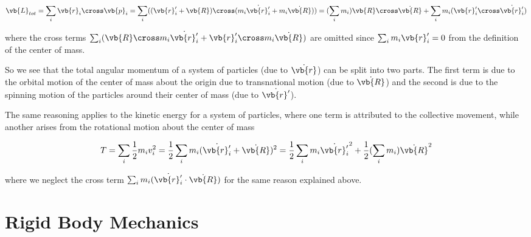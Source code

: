 \documentclass[a4paper,12pt]{report}
\begin{document}
\begin{equation}
	\vb{L} _{tot} = \sum_{i}^{} \vb{r} _{i} \cross \vb{p} _{i} = \sum_{i}^{}  ((\vb{r} '_{i} + \vb{R} ) \cross (m_{i}\dot{\vb{r} '_{i} }  + m_{i} \dot{\vb{R} } )) = (\sum_{i}^{} m_{i}) \vb{R} \cross \dot{\vb{R} } + \sum_{i}^{} m_{i} (\vb{r} '_{i} \cross \dot{\vb{r} '_{i} } )  \label{L1}   
\end{equation}

where the cross terms \(\sum_{i}^{} (\vb{R} \cross m_{i} \dot{\vb{r} '_{i} }  + \vb{r} '_{i} \cross m_{i}  \dot{\vb{R} } ) \) are omitted since \(\sum_{i}^{} m_{i} \vb{r} '_{i} = 0 \) from the definition of the center of mass.

So we see that the total angular momentum of a system of particles (due to \(\dot{\vb{r} } \))  can be split into two parts. The first term is due to the orbital motion of the center of mass about the origin due to transnational motion (due to \(\dot{\vb{R} } \))  and the second is due to the spinning motion of the particles around their center of mass (due to \(\dot{\vb{r} '} \)).

The same reasoning applies to the kinetic energy for a system of particles, where one term is attributed to the collective movement, while another arises from the rotational motion about the center of mass

\begin{equation}
	T = \sum_{i}^{} \frac{1}{2} m_{i} v_{i} ^2 = \frac{1}{2}  \sum_{i}^{}  m_{i} (\dot{\vb{r} '_{i} } + \dot{\vb{R} } )^2 = \frac{1}{2} \sum_{i}^{} m_{i} \dot{\vb{r} '_{i} } ^2 + \frac{1}{2} (\sum_{i}^{} m_{i} ) \dot{\vb{R} } ^2  \label{T1}   
\end{equation}

where we neglect the cross term \(\sum_{i}^{} m_{i} (\dot{\vb{r} '_{i} } \cdot \dot{\vb{R} })  \) for the same reason explained above. 




\newpage
\section{Rigid Body Mechanics}
\end{document}
